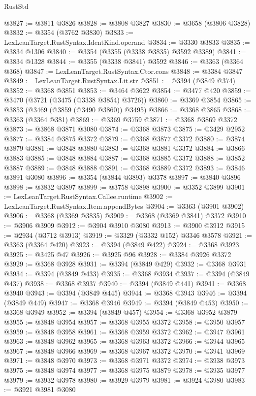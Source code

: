 \begin{lexlean}{RustStd}
\begin{coremodule}
@3827 := @3811 @3826
@3828 := @3808 @3827
@3830 := @3658 (@3806 @3828)
@3832 := @3354 (@3762 @3830)
@3833 := LexLeanTarget.RustSyntax.IdentKind.operand
@3834 := @3330 @3833
@3835 := @3834 @1306
@3840 := @3354 (@3355 (@3338 @3835) @3592 @3389)
@3841 := @3834 @1328
@3844 := @3355 (@3338 @3841) @3592
@3846 := @3363 (@3364 @368)
@3847 := LexLeanTarget.RustSyntax.Ctor.cons
@3848 := @3384 @3847
@3849 := LexLeanTarget.RustSyntax.Lit.str
@3851 := @3394 (@3849 @374)
@3852 := @3368 @3851
@3853 := @3464 @3622
@3854 := @3477 @420
@3859 := @3470 (@3721 (@3475 (@3338 @3854) @3726))
@3860 := @3369 @3854
@3865 := @3853 (@3469 (@3859 (@3490 @3860)) @3495)
@3866 := @3368 @3865
@3868 := @3363 (@3364 @381)
@3869 := @3369 @3759
@3871 := @3368 @3869 @3372
@3873 := @3868 @3871 @3080
@3874 := @3368 @3873
@3875 := @3429 @2952
@3877 := @3384 @3875 @3372
@3879 := @3368 @3877 @3372
@3880 := @3874 @3879
@3881 := @3848 @3880
@3883 := @3368 @3881 @3372
@3884 := @3866 @3883
@3885 := @3848 @3884
@3887 := @3368 @3885 @3372
@3888 := @3852 @3887
@3889 := @3848 @3888
@3891 := @3368 @3889 @3372
@3893 := @3846 @3891 @3080
@3896 := @3354 (@3844 @3893) @3378
@3897 := @3840 @3896
@3898 := @3832 @3897
@3899 := @3758 @3898
@3900 := @3352 @3899
@3901 := LexLeanTarget.RustSyntax.Callee.runtime
@3902 := LexLeanTarget.RustSyntax.Item.appendBytes
@3904 := @3363 (@3901 @3902)
@3906 := @3368 (@3369 @3835)
@3909 := @3368 (@3369 @3841) @3372
@3910 := @3906 @3909
@3912 := @3904 @3910 @3080
@3913 := @3900 @3912
@3915 := @2934 (@3712 @3913)
@3919 := @3329 (@3332 @152) @3346 @3578
@3921 := @3363 (@3364 @420)
@3923 := @3394 (@3849 @422)
@3924 := @3368 @3923
@3925 := @3425 @47
@3926 := @3925 @96
@3928 := @3384 @3926 @3372
@3929 := @3368 @3928
@3931 := @3394 (@3849 @429)
@3932 := @3368 @3931
@3934 := @3394 (@3849 @433)
@3935 := @3368 @3934
@3937 := @3394 (@3849 @437)
@3938 := @3368 @3937
@3940 := @3394 (@3849 @441)
@3941 := @3368 @3940
@3943 := @3394 (@3849 @445)
@3944 := @3368 @3943
@3946 := @3394 (@3849 @449)
@3947 := @3368 @3946
@3949 := @3394 (@3849 @453)
@3950 := @3368 @3949
@3952 := @3394 (@3849 @457)
@3954 := @3368 @3952 @3879
@3955 := @3848 @3954
@3957 := @3368 @3955 @3372
@3958 := @3950 @3957
@3959 := @3848 @3958
@3961 := @3368 @3959 @3372
@3962 := @3947 @3961
@3963 := @3848 @3962
@3965 := @3368 @3963 @3372
@3966 := @3944 @3965
@3967 := @3848 @3966
@3969 := @3368 @3967 @3372
@3970 := @3941 @3969
@3971 := @3848 @3970
@3973 := @3368 @3971 @3372
@3974 := @3938 @3973
@3975 := @3848 @3974
@3977 := @3368 @3975 @3879
@3978 := @3935 @3977
@3979 := @3932 @3978
@3980 := @3929 @3979
@3981 := @3924 @3980
@3983 := @3921 @3981 @3080

\end{coremodule}
\end{lexlean}
